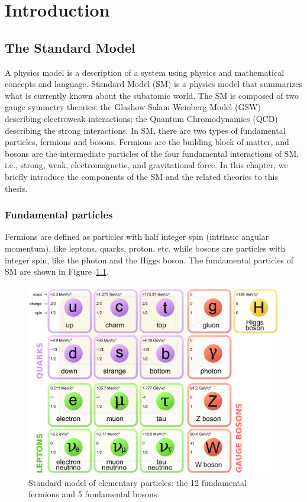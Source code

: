 \chapter{Introduction}
\label{label:chapIntro}

\section{The Standard Model}
A physics model is a description of a system using physics and mathematical concepts and language.
Standard Model (SM) is a physics model that summarizes what is currently known about the subatomic world. The SM is composed of two gauge symmetry theories: the Glashow-Salam-Weinberg Model (GSW)~\cite{Glashow, Salam, Weinberg} describing electroweak interactions; the Quantum Chromodynamics 
(QCD)~\cite{QCD} describing the strong interactions. 
In SM, there are 
two types of fundamental particles, fermions and bosons. Fermions are the building block of matter,
and bosons are the intermediate particles of the four fundamental interactions of SM, i.e., strong, weak, electromagnetic, and
gravitational force. 
In this chapter, we briefly introduce the components of the SM and the related theories to this thesis. 


\subsection{Fundamental particles}

Fermions are defined as particles with half integer spin (intrinsic angular momentum), like leptons, quarks, proton, etc, while bosons are particles with integer spin, like the photon and the Higgs boson.
The fundamental particles of SM are shown in Figure~\ref{fig:SMParticles}. 

\begin{figure}[!htbp]
\centering
\includegraphics[width=.7\textwidth]{figures/Standard_Model_particles.png}
\caption{Standard model of elementary particles: 
the 12 fundamental fermions and 5 fundamental bosons.~\cite{particleImage}}
\label{fig:SMParticles}
\end{figure}  


